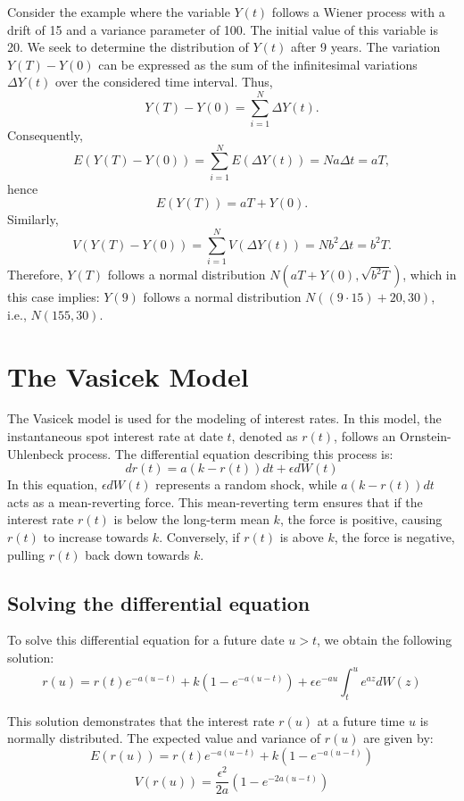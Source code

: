 \documentclass[a4paper,10pt]{article}
\begin{document}
\noindent Consider the example where the variable \( Y(t) \) follows a Wiener process with a drift of 15 and a variance parameter of 100. The initial value of this variable is 20. We seek to determine the distribution of \( Y(t) \) after 9 years. The variation \( Y(T) - Y(0) \) can be expressed as the sum of the infinitesimal variations \( \Delta Y(t) \) over the considered time interval. Thus, \[ Y(T) - Y(0) = \sum_{i=1}^{N} \Delta Y(t). \] Consequently, \[ E(Y(T) - Y(0)) = \sum_{i=1}^{N} E(\Delta Y(t)) = N a \Delta t = a T, \] hence \[ E(Y(T)) = a T + Y(0). \] Similarly, \[ V(Y(T) - Y(0)) = \sum_{i=1}^{N} V(\Delta Y(t)) = N b^2 \Delta t = b^2 T. \] Therefore, \( Y(T) \) follows a normal distribution \( N(a T + Y(0), \sqrt{b^2 T}) \), which in this case implies: \( Y(9) \) follows a normal distribution \( N((9 \cdot 15) + 20, 30) \), i.e., \( N(155, 30) \). \\


\section{The Vasicek Model}

\noindent The Vasicek model is used for the modeling of interest rates. In this model, the instantaneous spot interest rate at date \( t \), denoted as \( r(t) \), follows an Ornstein-Uhlenbeck process. The differential equation describing this process is:
\[dr(t) = a(k - r(t))dt + \epsilon dW(t)\]
\noindent In this equation, \( \epsilon dW(t) \) represents a random shock, while \( a(k - r(t))dt \) acts as a mean-reverting force. This mean-reverting term ensures that if the interest rate \( r(t) \) is below the long-term mean \( k \), the force is positive, causing \( r(t) \) to increase towards \( k \). Conversely, if \( r(t) \) is above \( k \), the force is negative, pulling \( r(t) \) back down towards \( k \). \\

\subsection{Solving the differential equation}

\noindent To solve this differential equation for a future date \( u > t \), we obtain the following solution:
\[r(u) = r(t)e^{-a(u-t)} + k(1 - e^{-a(u-t)}) + \epsilon e^{-au} \int_{t}^{u} e^{az} dW(z)\]

\noindent This solution demonstrates that the interest rate \( r(u) \) at a future time \( u \) is normally distributed. The expected value and variance of \( r(u) \) are given by: 
\[E(r(u)) = r(t)e^{-a(u-t)} + k(1 - e^{-a(u-t)})\]
\[V(r(u)) = \frac{\epsilon^2}{2a} (1 - e^{-2a(u-t)})\]
\end{document}
